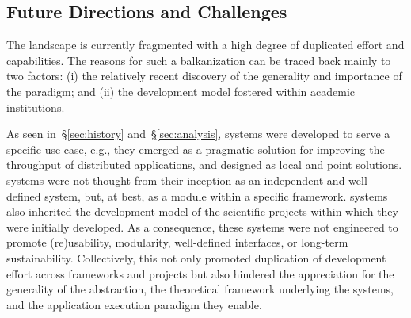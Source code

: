 \documentclass{sig-alternate}
\begin{document}



%
\subsection{Future Directions and Challenges}
\label{sec:future}

The \pilot landscape is currently fragmented with a high degree of duplicated
effort and capabilities. The reasons for such a balkanization can be traced back
mainly to two factors: (i) the relatively recent discovery of the generality and
importance of the \pilot paradigm; and (ii) the development model fostered
within academic institutions.

As seen in~\S\ref{sec:history} and~\S\ref{sec:analysis}, \pilot systems were
developed to serve a specific use case, e.g., they emerged as a pragmatic
solution for improving the throughput of distributed applications, and designed
as local and point solutions. \pilot systems were not thought from their
inception as an independent and well-defined system, but, at best, as a module
within a specific framework. \pilot systems also inherited the development model
of the scientific projects within which they were initially developed. As a
consequence, these systems were not engineered to promote (re)usability,
modularity, well-defined interfaces, or long-term sustainability. Collectively,
this not only promoted duplication of development effort across frameworks and
projects but also hindered the appreciation for the generality of the \pilot
abstraction, the theoretical framework underlying the \pilot systems, and the
application execution paradigm they enable.

\end{document}
